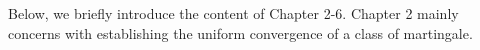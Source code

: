 Below, we briefly introduce the content of Chapter 2-6.
Chapter 2 mainly concerns with establishing the uniform convergence of a class of martingale.




